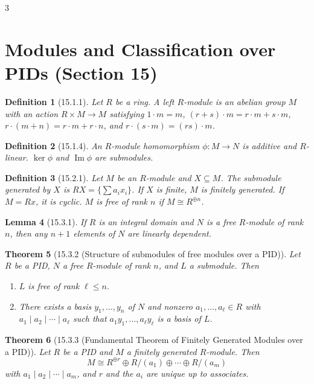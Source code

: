 \documentclass[10pt,landscape]{article}
\newtheorem{theorem}{Theorem}[section]
\newtheorem{definition}[theorem]{Definition}
\newtheorem{lemma}[theorem]{Lemma}
\begin{document}
\begin{multicols}{3}
\section{Modules and Classification over PIDs (Section 15)}

\begin{definition}[15.1.1]
Let $R$ be a ring. A left $R$-module is an abelian group $M$ with an action $R\times M\to M$ satisfying $1\cdot m=m$, $(r+s)\cdot m = r\cdot m+s\cdot m$, $r\cdot(m+n)=r\cdot m+r\cdot n$, and $r\cdot(s\cdot m)=(rs)\cdot m$.
\end{definition}

\begin{definition}[15.1.4]
An $R$-module homomorphism $\phi:M\to N$ is additive and $R$-linear. $\ker\phi$ and $\operatorname{Im}\phi$ are submodules.
\end{definition}

\begin{definition}[15.2.1]
Let $M$ be an $R$-module and $X\subseteq M$. The submodule generated by $X$ is $RX = \{\sum a_i x_i\}$. If $X$ is finite, $M$ is finitely generated. If $M=Rx$, it is cyclic. $M$ is free of rank $n$ if $M\cong R^{\oplus n}$.
\end{definition}

\begin{lemma}[15.3.1]
If $R$ is an integral domain and $N$ is a free $R$-module of rank $n$, then any $n+1$ elements of $N$ are linearly dependent.
\end{lemma}

\begin{theorem}[15.3.2 (Structure of submodules of free modules over a PID)]
Let $R$ be a PID, $N$ a free $R$-module of rank $n$, and $L$ a submodule. Then
\begin{enumerate}
\item $L$ is free of rank $\ell\le n$.
\item There exists a basis $y_1,\dots,y_n$ of $N$ and nonzero $a_1,\dots,a_\ell\in R$ with $a_1\mid a_2\mid\cdots\mid a_\ell$ such that $a_1y_1,\dots,a_\ell y_\ell$ is a basis of $L$.
\end{enumerate}
\end{theorem}

\begin{theorem}[15.3.3 (Fundamental Theorem of Finitely Generated Modules over a PID)]
Let $R$ be a PID and $M$ a finitely generated $R$-module. Then
\[
M \cong R^{\oplus r} \oplus R/(a_1) \oplus \cdots \oplus R/(a_m)
\]
with $a_1\mid a_2\mid\cdots\mid a_m$, and $r$ and the $a_i$ are unique up to associates.
\end{theorem}


\end{multicols}
\end{document}
